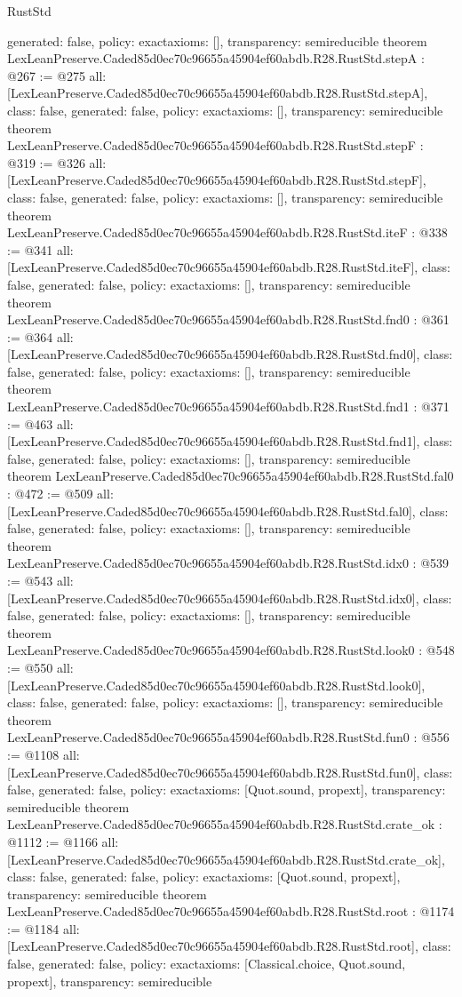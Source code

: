 \begin{lexlean}{RustStd}
\begin{coremodule}
{  generated: false,
  policy: exact{axioms: []},
  transparency: semireducible
}
theorem LexLeanPreserve.Caded85d0ec70c96655a45904ef60abdb.R28.RustStd.stepA : @267 := @275 {
  all: [LexLeanPreserve.Caded85d0ec70c96655a45904ef60abdb.R28.RustStd.stepA],
  class: false,
  generated: false,
  policy: exact{axioms: []},
  transparency: semireducible
}
theorem LexLeanPreserve.Caded85d0ec70c96655a45904ef60abdb.R28.RustStd.stepF : @319 := @326 {
  all: [LexLeanPreserve.Caded85d0ec70c96655a45904ef60abdb.R28.RustStd.stepF],
  class: false,
  generated: false,
  policy: exact{axioms: []},
  transparency: semireducible
}
theorem LexLeanPreserve.Caded85d0ec70c96655a45904ef60abdb.R28.RustStd.iteF : @338 := @341 {
  all: [LexLeanPreserve.Caded85d0ec70c96655a45904ef60abdb.R28.RustStd.iteF],
  class: false,
  generated: false,
  policy: exact{axioms: []},
  transparency: semireducible
}
theorem LexLeanPreserve.Caded85d0ec70c96655a45904ef60abdb.R28.RustStd.fnd0 : @361 := @364 {
  all: [LexLeanPreserve.Caded85d0ec70c96655a45904ef60abdb.R28.RustStd.fnd0],
  class: false,
  generated: false,
  policy: exact{axioms: []},
  transparency: semireducible
}
theorem LexLeanPreserve.Caded85d0ec70c96655a45904ef60abdb.R28.RustStd.fnd1 : @371 := @463 {
  all: [LexLeanPreserve.Caded85d0ec70c96655a45904ef60abdb.R28.RustStd.fnd1],
  class: false,
  generated: false,
  policy: exact{axioms: []},
  transparency: semireducible
}
theorem LexLeanPreserve.Caded85d0ec70c96655a45904ef60abdb.R28.RustStd.fal0 : @472 := @509 {
  all: [LexLeanPreserve.Caded85d0ec70c96655a45904ef60abdb.R28.RustStd.fal0],
  class: false,
  generated: false,
  policy: exact{axioms: []},
  transparency: semireducible
}
theorem LexLeanPreserve.Caded85d0ec70c96655a45904ef60abdb.R28.RustStd.idx0 : @539 := @543 {
  all: [LexLeanPreserve.Caded85d0ec70c96655a45904ef60abdb.R28.RustStd.idx0],
  class: false,
  generated: false,
  policy: exact{axioms: []},
  transparency: semireducible
}
theorem LexLeanPreserve.Caded85d0ec70c96655a45904ef60abdb.R28.RustStd.look0 : @548 := @550 {
  all: [LexLeanPreserve.Caded85d0ec70c96655a45904ef60abdb.R28.RustStd.look0],
  class: false,
  generated: false,
  policy: exact{axioms: []},
  transparency: semireducible
}
theorem LexLeanPreserve.Caded85d0ec70c96655a45904ef60abdb.R28.RustStd.fun0 : @556 := @1108 {
  all: [LexLeanPreserve.Caded85d0ec70c96655a45904ef60abdb.R28.RustStd.fun0],
  class: false,
  generated: false,
  policy: exact{axioms: [Quot.sound, propext]},
  transparency: semireducible
}
theorem LexLeanPreserve.Caded85d0ec70c96655a45904ef60abdb.R28.RustStd.crate_ok : @1112 := @1166 {
  all: [LexLeanPreserve.Caded85d0ec70c96655a45904ef60abdb.R28.RustStd.crate_ok],
  class: false,
  generated: false,
  policy: exact{axioms: [Quot.sound, propext]},
  transparency: semireducible
}
theorem LexLeanPreserve.Caded85d0ec70c96655a45904ef60abdb.R28.RustStd.root : @1174 := @1184 {
  all: [LexLeanPreserve.Caded85d0ec70c96655a45904ef60abdb.R28.RustStd.root],
  class: false,
  generated: false,
  policy: exact{axioms: [Classical.choice, Quot.sound, propext]},
  transparency: semireducible
}


\end{coremodule}
\end{lexlean}
